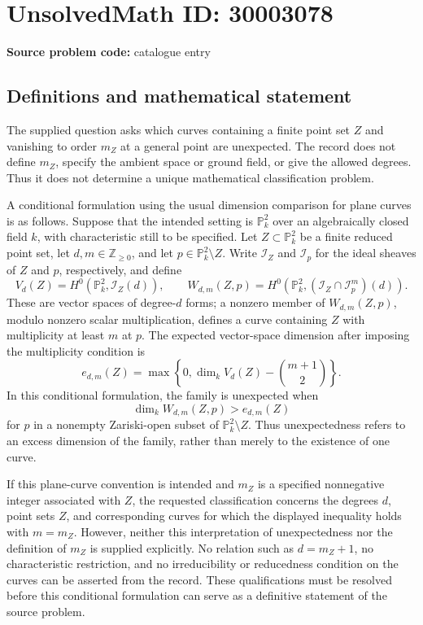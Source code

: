 \documentclass[11pt]{article}
\newcommand{\Z}{\mathbb{Z}}
\newcommand{\PP}{\mathbb{P}}
\begin{document}
\section*{UnsolvedMath ID: 30003078}
\textbf{Source problem code:} catalogue entry
\subsection{Definitions and mathematical statement}
The supplied question asks which curves containing a finite point set \(Z\) and vanishing to order \(m_Z\) at a general point are unexpected. The record does not define \(m_Z\), specify the ambient space or ground field, or give the allowed degrees. Thus it does not determine a unique mathematical classification problem.

A conditional formulation using the usual dimension comparison for plane curves is as follows. Suppose that the intended setting is \(\PP^2_k\) over an algebraically closed field \(k\), with characteristic still to be specified. Let \(Z\subset\PP^2_k\) be a finite reduced point set, let \(d,m\in\Z_{\geq 0}\), and let \(p\in\PP^2_k\setminus Z\). Write \(\mathcal I_Z\) and \(\mathcal I_p\) for the ideal sheaves of \(Z\) and \(p\), respectively, and define
\[
V_d(Z)=H^0\!\left(\PP^2_k,\mathcal I_Z(d)\right),\qquad
W_{d,m}(Z,p)=H^0\!\left(\PP^2_k,(\mathcal I_Z\cap\mathcal I_p^m)(d)\right).
\]
These are vector spaces of degree-\(d\) forms; a nonzero member of \(W_{d,m}(Z,p)\), modulo nonzero scalar multiplication, defines a curve containing \(Z\) with multiplicity at least \(m\) at \(p\). The expected vector-space dimension after imposing the multiplicity condition is
\[
e_{d,m}(Z)=\max\!\left\{0,\dim_k V_d(Z)-\binom{m+1}{2}\right\}.
\]
In this conditional formulation, the family is unexpected when
\[
\dim_k W_{d,m}(Z,p)>e_{d,m}(Z)
\]
for \(p\) in a nonempty Zariski-open subset of \(\PP^2_k\setminus Z\). Thus unexpectedness refers to an excess dimension of the family, rather than merely to the existence of one curve.

If this plane-curve convention is intended and \(m_Z\) is a specified nonnegative integer associated with \(Z\), the requested classification concerns the degrees \(d\), point sets \(Z\), and corresponding curves for which the displayed inequality holds with \(m=m_Z\). However, neither this interpretation of unexpectedness nor the definition of \(m_Z\) is supplied explicitly. No relation such as \(d=m_Z+1\), no characteristic restriction, and no irreducibility or reducedness condition on the curves can be asserted from the record. These qualifications must be resolved before this conditional formulation can serve as a definitive statement of the source problem.
\end{document}
